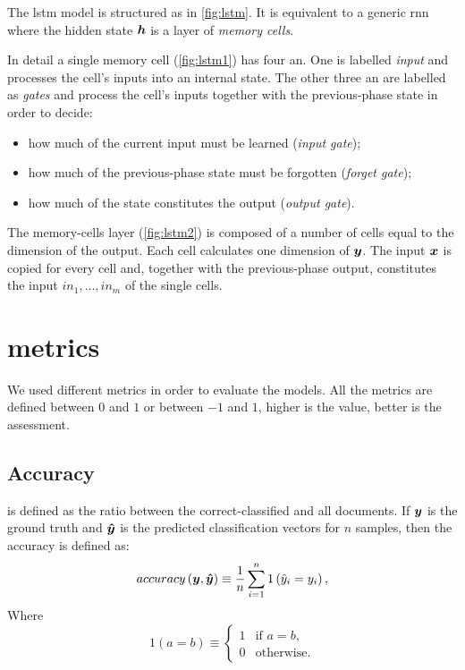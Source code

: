 The \ac{lstm} model is structured as in \cref{fig:lstm}. It is
equivalent to a
generic \ac{rnn} where the hidden state $\bm{h}$ is a
layer of \emph{memory cells}.

In detail a single
memory cell (\cref{fig:lstm1}) has four \acf{an}. One is labelled \emph{input}
and processes the cell's 
inputs into an internal state. The other three \ac{an} are labelled as
\emph{gates} and process the cell's inputs together with the previous-phase
state in order to decide:
\begin{itemize}
\item how much of the current input must be learned
  (\emph{input gate});
\item how much of the previous-phase state must be forgotten
  (\emph{forget gate});
\item how much of the state constitutes the output (\emph{output gate}).
\end{itemize}

The memory-cells layer (\cref{fig:lstm2}) is composed of a number of
cells equal to the dimension of the output. Each cell
calculates one dimension of $\bm{y}$. The input $\bm{x}$ is copied
for every cell and, together with the previous-phase
output,
constitutes the input $in_1,\dots,in_m$ of the single cells.

\section{metrics}
We used different metrics in order to evaluate the models.
All the metrics are defined between $0$ and $1$ or between $-1$ and $1$,
higher is the value, better is the assessment.

\subsection{Accuracy}
is defined
as the ratio between the correct-classified and all documents. If $\bm{y}$
is the ground truth and $\bm{\hat y}$ is the predicted
classification vectors for $n$ samples, then the accuracy is defined
as:
\begin{equation*}
  accuracy\left(\bm{y}, \bm{\hat y}\right) \equiv
  \frac{1}{n}\sum_{i=1}^{n} 1\left(\hat y_i = y_i\right),
\end{equation*}
Where
\begin{equation*}
  1(a = b)\equiv
  \begin{cases}
    1 & \text{if }a = b,\\
    0 & \text{otherwise}.
  \end{cases}
\end{equation*}

